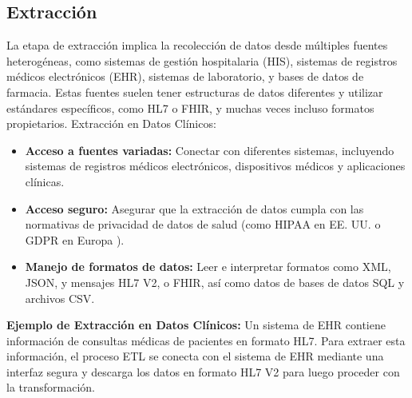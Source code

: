 \documentclass[12pt, a4paper, twoside]{article}
\begin{document}
	\subsection{Extracción}
	La etapa de extracción implica la recolección de datos desde múltiples fuentes heterogéneas, como sistemas de gestión hospitalaria (HIS), sistemas de registros médicos electrónicos (EHR), sistemas de laboratorio, y bases de datos de farmacia. Estas fuentes suelen tener estructuras de datos diferentes y utilizar estándares específicos, como HL7 o FHIR, y muchas veces incluso formatos propietarios\cite{keepcodingExtraccion}.
	Extracción en Datos Clínicos:
	\begin{itemize}
		\item \textbf{Acceso a fuentes variadas:} Conectar con diferentes sistemas, incluyendo sistemas de registros médicos electrónicos, dispositivos médicos y aplicaciones clínicas.
		
		\item \textbf{Acceso seguro:} Asegurar que la extracción de datos cumpla con las normativas de privacidad de datos de salud (como HIPAA en EE. UU. \cite{fbiHIPAA} o GDPR en Europa \cite{comisionEUDataProtection}).
		
		\item \textbf{Manejo de formatos de datos:} Leer e interpretar formatos como XML, JSON, y mensajes HL7 V2, o FHIR, así como datos de bases de datos SQL y archivos CSV.
	\end{itemize}
	
	\textbf{Ejemplo de Extracción en Datos Clínicos:} Un sistema de EHR contiene información de consultas médicas de pacientes en formato HL7. Para extraer esta información, el proceso ETL se conecta con el sistema de EHR mediante una interfaz segura y descarga los datos en formato HL7 V2 para luego proceder con la transformación.
	
\end{document}
